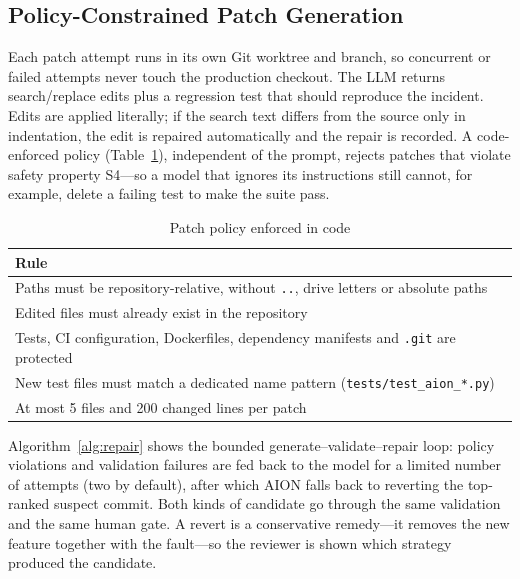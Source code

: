 \documentclass[conference]{IEEEtran}
\begin{document}
\subsection{Policy-Constrained Patch Generation}
\label{sec:patch}
Each patch attempt runs in its own Git worktree and branch, so concurrent or failed attempts never touch the production checkout. The LLM returns search/replace edits plus a regression test that should reproduce the incident. Edits are applied literally; if the search text differs from the source only in indentation, the edit is repaired automatically and the repair is recorded. A code-enforced policy (Table~\ref{tab:policy}), independent of the prompt, rejects patches that violate safety property S4---so a model that ignores its instructions still cannot, for example, delete a failing test to make the suite pass.

\begin{table}[t]
\centering
\caption{Patch policy enforced in code}
\label{tab:policy}
\footnotesize
\begin{tabular}{@{}p{7.7cm}@{}}
\toprule
Rule \\
\midrule
Paths must be repository-relative, without \texttt{..}, drive letters or absolute paths \\
Edited files must already exist in the repository \\
Tests, CI configuration, Dockerfiles, dependency manifests and \texttt{.git} are protected \\
New test files must match a dedicated name pattern (\texttt{tests/test\_aion\_*.py}) \\
At most 5 files and 200 changed lines per patch \\
\bottomrule
\end{tabular}
\end{table}

Algorithm~\ref{alg:repair} shows the bounded generate--validate--repair loop: policy violations and validation failures are fed back to the model for a limited number of attempts (two by default), after which AION falls back to reverting the top-ranked suspect commit. Both kinds of candidate go through the same validation and the same human gate. A revert is a conservative remedy---it removes the new feature together with the fault---so the reviewer is shown which strategy produced the candidate.
\end{document}
